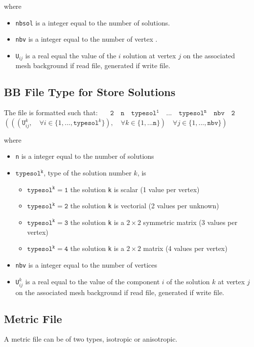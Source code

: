 \documentclass[a4paper,twoside,12pt]{book}
\begin{document}
where
\begin{itemize}
\item {\tt  nbsol} is a integer equal to  the number of solutions.
\item  {\tt nbv} is  a integer equal to the number of vertex .
\item  {\tt U$_{ij}$} is a real equal the value of the $i$ solution at vertex $j$
on the associated mesh background if read file, generated if write file.
\end{itemize}

\subsection {BB File Type for Store Solutions}
The file is formatted such that:
{\tt \obeylines
  $ \mathtt{ \quad 2 \quad n \quad typesol^1 \quad ... \quad typesol^n \quad  nbv \quad 2}  $
  $\left(\left(\left( \mathtt{U}_{ij}^k, \quad \forall i \in \{1,...,\mathtt{typesol}^k\}\right), %
\quad \forall k \in \{1,...\mathtt{n}\}\right) %
 \quad \forall j \in \{1,...,\mathtt{nbv}\}\right)$
 }

where
\begin{itemize}
\item {\tt  n} is a integer equal to  the number of solutions
\item $\mathtt{  typesol^k}$, type of the solution  number $ k$, is
  \begin{itemize}
   \item $\mathtt{typesol^k = 1}$ the solution {\tt k} is scalar  (1  value per vertex)
   \item $\mathtt{typesol^k = 2}$ the solution {\tt k} is vectorial  (2 values per unknown)
   \item $\mathtt{typesol^k = 3}$ the solution {\tt k} is a  $2{\times} 2$ symmetric matrix  (3 values per vertex)
   \item $\mathtt{typesol^k = 4}$ the solution  {\tt k} is a  $2{\times} 2$ matrix  (4 values per vertex)
   \end{itemize}

\item  {\tt nbv} is  a integer equal to the number of vertices
\item  {\tt U$_{ij}^k$} is a real equal to the value of the component  $i$ of the solution  $k$ at vertex $j$
on the associated mesh background if read file, generated if write file.
\end{itemize}


\subsection{Metric File}
 A metric file can be of two types, isotropic or anisotropic.
\label{Metric file}
\end{document}
